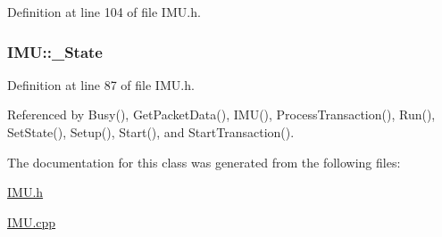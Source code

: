 Definition at line 104 of file IMU.h.

\hypertarget{class_i_m_u_a2e3c70d02cc2b3dd98ce8153d02cf04e}{
\subsubsection[{\_\-State}]{ {\bf IMU::\_\-State}}}
\label{class_i_m_u_a2e3c70d02cc2b3dd98ce8153d02cf04e}


Definition at line 87 of file IMU.h.



Referenced by Busy(), GetPacketData(), IMU(), ProcessTransaction(), Run(), SetState(), Setup(), Start(), and StartTransaction().



The documentation for this class was generated from the following files:\begin{DoxyCompactItemize}
\item 
\hyperlink{_i_m_u_8h}{IMU.h}\item 
\hyperlink{_i_m_u_8cpp}{IMU.cpp}\end{DoxyCompactItemize}
